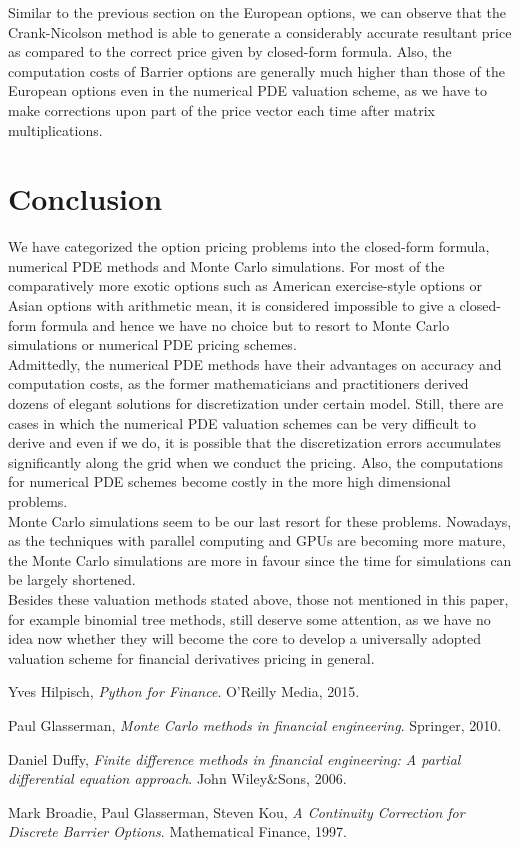 Similar to the previous section on the European options, we can observe that the Crank-Nicolson method is able to generate a considerably accurate resultant price as compared to the correct price given by closed-form formula. Also, the computation costs of Barrier options are generally much higher than those of the European options even in the numerical PDE valuation scheme, as we have to make corrections upon part of the price vector each time after matrix multiplications.
\newpage

\section{Conclusion}
We have categorized the option pricing problems into the closed-form formula, numerical PDE methods and Monte Carlo simulations. For most of the comparatively more exotic options such as American exercise-style options or Asian options with arithmetic mean, it is considered impossible to give a closed-form formula and hence we have no choice but to resort to Monte Carlo simulations or numerical PDE pricing schemes.\\[1mm]
Admittedly, the numerical PDE methods have their advantages on accuracy and computation costs, as the former mathematicians and practitioners derived dozens of elegant solutions for discretization under certain model. Still, there are cases in which the numerical PDE valuation schemes can be very difficult to derive and even if we do, it is possible that the discretization errors accumulates significantly along the grid when we conduct the pricing. Also, the computations for numerical PDE schemes become costly in the more high dimensional problems.\\[1mm]
Monte Carlo simulations seem to be our last resort for these problems. Nowadays, as the techniques with parallel computing and GPUs are becoming more mature, the Monte Carlo simulations are more in favour since the time for simulations can be largely shortened.\\[1mm]
Besides these valuation methods stated above, those not mentioned in this paper, for example binomial tree methods, still deserve some attention, as we have no idea now whether they will become the core to develop a universally adopted valuation scheme for financial derivatives pricing in general.

\newpage
\begin{thebibliography}{9}
Yves Hilpisch,
\textit{Python for Finance}. 
O'Reilly Media, 2015.
 
Paul Glasserman,
\textit{Monte Carlo methods in financial engineering}.
Springer, 2010.

Daniel Duffy,
\textit{Finite difference methods in financial engineering: A partial differential equation approach}.
John Wiley\&Sons, 2006.

Mark Broadie, Paul Glasserman, Steven Kou,
\textit{A Continuity Correction for Discrete Barrier Options}.
Mathematical Finance, 1997.

\end{thebibliography}
